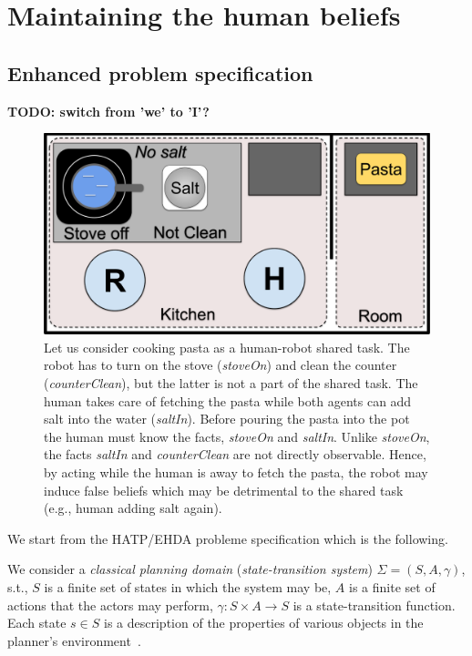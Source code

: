 \section{Maintaining the human beliefs}

    \subsection{Enhanced problem specification}

\textbf{TODO: switch from 'we' to 'I'?}

\begin{figure}[t!]
    \centering
    \includegraphics[width=0.70\linewidth]{images/Chapter3/cooking_task_draw.png}
    \caption{
    Let us consider cooking pasta as a human-robot shared task. 
    The robot has to turn on the stove (\textit{stoveOn}) and clean the counter (\textit{counterClean}), but the latter is not a part of the shared task. The human takes care of fetching the pasta while both agents can add salt into the water (\textit{saltIn}). Before pouring the pasta into the pot the human must know the facts, \textit{stoveOn} and \textit{saltIn}. 
    Unlike \textit{stoveOn}, the facts \textit{saltIn} and \textit{counterClean} are not directly observable. 
    Hence, by acting while the human is away to fetch the pasta, the robot may induce false beliefs which may be detrimental to the shared task (e.g., human adding salt again).
    }
    \label{fig:new_scene}
\end{figure}

We start from the HATP/EHDA probleme specification which is the following.

We consider a \textit{classical planning domain} (\textit{state-transition system}) $\Sigma = (S,A,\gamma)$, s.t., $S$ is a finite set of states in which the system may be, $A$ is a finite set of actions that the actors may perform, $\gamma : S \times A \rightarrow S$ is a state-transition function. Each state $s \in S$ is a description of the properties of various objects in the planner's environment~\cite{naubooks0014222}. 

